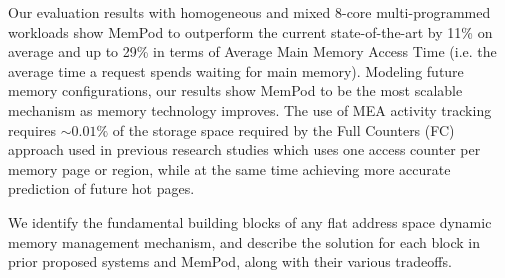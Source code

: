 Our evaluation results with homogeneous and mixed 8-core multi-programmed workloads show MemPod to outperform the current state-of-the-art by 11\% on average and up to 29\% in terms of Average Main Memory Access Time (i.e. the average time a request spends waiting for main memory). Modeling future memory configurations, our results show MemPod to be the most scalable mechanism as memory technology improves. The use of MEA activity tracking requires $\sim0.01\%$ of the storage space required by the Full Counters (FC) approach used in previous research studies which uses one access counter per memory page or region, while at the same time achieving more accurate prediction
of future hot pages.


We identify the fundamental building blocks of any flat address space dynamic 
memory management mechanism, and describe the solution for each block in 
prior proposed systems and MemPod, along with their various tradeoffs. 


